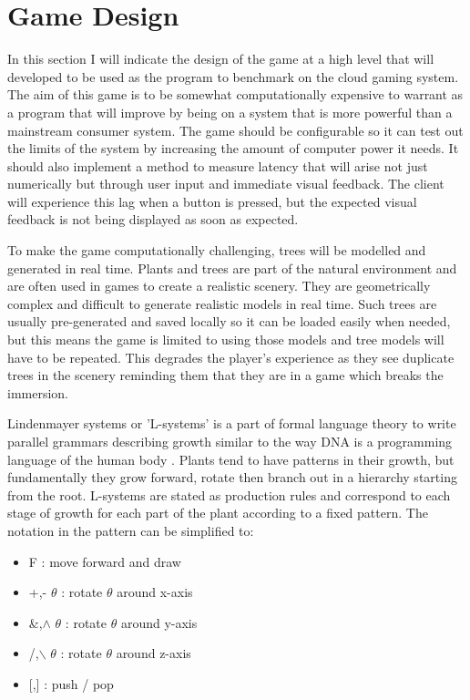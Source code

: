 \section{Game Design}
In this section I will indicate the design of the game at a high level that will developed to be used as the program to benchmark on the cloud gaming system. The aim of this game is to be somewhat computationally expensive to warrant as a program that will improve by being on a system that is more powerful than a mainstream consumer system. The game should be configurable so it can test out the limits of the system by increasing the amount of computer power it needs. It should also implement a method to measure latency that will arise not just numerically but through user input and immediate visual feedback. The client will experience this lag when a button is pressed, but the expected visual feedback is not being displayed as soon as expected.
\newline
\par
To make the game computationally challenging, trees will be modelled and generated in real time. Plants and trees are part of the natural environment and are often used in games to create a realistic scenery. They are geometrically complex and difficult to generate realistic models in real time. Such trees are usually pre-generated and saved locally so it can be loaded easily when needed, but this means the game is limited to using those models and tree models will have to be repeated. This degrades the player's experience as they see duplicate trees in the scenery reminding them that they are in a game which breaks the immersion.
\newline
\par
Lindenmayer systems or 'L-systems' is a part of formal language theory to write parallel grammars describing growth similar to the way DNA is a programming language of the human body \cite{prusinkiewicz2012algorithmic}. Plants tend to have patterns in their growth, but fundamentally they grow forward, rotate then branch out in a hierarchy starting from the root. L-systems are stated as production rules and correspond to each stage of growth for each part of the plant according to a fixed pattern. The notation in the pattern can be simplified to:
\begin{itemize}
 \item F 	:	move forward and draw
 \item +,- \(\theta\)	:	rotate \(\theta\) around x-axis
 \item \&,\(\wedge\) \(\theta\)	:	rotate \(\theta\) around y-axis
 \item /,\(\backslash\) \(\theta\)	:	rotate \(\theta\) around z-axis
 \item {[,]}	:	push / pop
\end{itemize}
